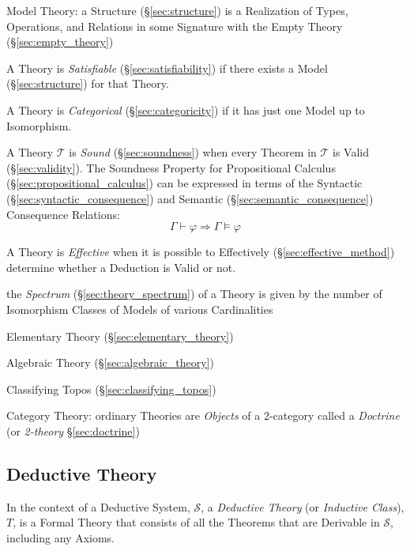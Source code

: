 Model Theory: a Structure (\S\ref{sec:structure}) is a Realization of
Types, Operations, and Relations in some Signature with the Empty
Theory (\S\ref{sec:empty_theory})

A Theory is \emph{Satisfiable} (\S\ref{sec:satisfiability}) if there
exists a Model (\S\ref{sec:structure}) for that Theory.

A Theory is \emph{Categorical} (\S\ref{sec:categoricity}) if it has
just one Model up to Isomorphism.

A Theory $\mathcal{T}$ is \emph{Sound} (\S\ref{sec:soundness}) when
every Theorem in $\mathcal{T}$ is Valid (\S\ref{sec:validity}). The
Soundness Property for Propositional Calculus
(\S\ref{sec:propositional_calculus}) can be expressed in terms of the
Syntactic (\S\ref{sec:syntactic_consequence}) and Semantic
(\S\ref{sec:semantic_consequence}) Consequence Relations:
\[
  \Gamma \vdash \varphi \Rightarrow \Gamma \vDash \varphi
\]

A Theory is \emph{Effective} when it is possible to Effectively
(\S\ref{sec:effective_method}) determine whether a Deduction is Valid
or not.

the \emph{Spectrum} (\S\ref{sec:theory_spectrum}) of a Theory is given by the
number of Isomorphism Classes of Models of various Cardinalities

Elementary Theory (\S\ref{sec:elementary_theory})

Algebraic Theory (\S\ref{sec:algebraic_theory})

Classifying Topos (\S\ref{sec:classifying_topos})

Category Theory: ordinary Theories are \emph{Objects} of a 2-category
called a \emph{Doctrine} (or \emph{2-theory} \S\ref{sec:doctrine})



\subsection{Deductive Theory}\label{sec:deductive_theory}

In the context of a Deductive System, $\mathcal{S}$, a \emph{Deductive
  Theory} (or \emph{Inductive Class}), $T$, is a Formal Theory that
consists of all the Theorems that are Derivable in $\mathcal{S}$,
including any Axioms.




